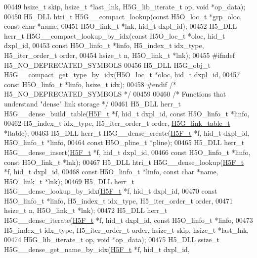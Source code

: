 \begin{DoxyCode}
00449     hsize\_t skip, hsize\_t *last\_lnk, H5G\_lib\_iterate\_t op, \textcolor{keywordtype}{void} *op\_data);
00450 H5\_DLL htri\_t H5G\_\_compact\_lookup(\textcolor{keyword}{const} H5O\_loc\_t *grp\_oloc, \textcolor{keyword}{const} \textcolor{keywordtype}{char} *name,
00451     H5O\_link\_t *lnk, hid\_t dxpl\_id);
00452 H5\_DLL herr\_t H5G\_\_compact\_lookup\_by\_idx(\textcolor{keyword}{const} H5O\_loc\_t *oloc, hid\_t dxpl\_id,
00453     \textcolor{keyword}{const} H5O\_linfo\_t *linfo, H5\_index\_t idx\_type, H5\_iter\_order\_t order,
00454     hsize\_t n, H5O\_link\_t *lnk);
00455 \textcolor{preprocessor}{#ifndef H5\_NO\_DEPRECATED\_SYMBOLS}
00456 H5\_DLL H5G\_obj\_t H5G\_\_compact\_get\_type\_by\_idx(H5O\_loc\_t *oloc, hid\_t dxpl\_id,
00457     \textcolor{keyword}{const} H5O\_linfo\_t *linfo, hsize\_t idx);
00458 \textcolor{preprocessor}{#endif }\textcolor{comment}{/* H5\_NO\_DEPRECATED\_SYMBOLS */}\textcolor{preprocessor}{}
00459 
00460 \textcolor{comment}{/* Functions that understand "dense" link storage */}
00461 H5\_DLL herr\_t H5G\_\_dense\_build\_table(\hyperlink{struct_h5_f__t}{H5F\_t} *f, hid\_t dxpl\_id, \textcolor{keyword}{const} H5O\_linfo\_t *linfo,
00462     H5\_index\_t idx\_type, H5\_iter\_order\_t order, \hyperlink{struct_h5_g__link__table__t}{H5G\_link\_table\_t} *ltable);
00463 H5\_DLL herr\_t H5G\_\_dense\_create(\hyperlink{struct_h5_f__t}{H5F\_t} *f, hid\_t dxpl\_id, H5O\_linfo\_t *linfo,
00464     \textcolor{keyword}{const} H5O\_pline\_t *pline);
00465 H5\_DLL herr\_t H5G\_\_dense\_insert(\hyperlink{struct_h5_f__t}{H5F\_t} *f, hid\_t dxpl\_id,
00466     \textcolor{keyword}{const} H5O\_linfo\_t *linfo, \textcolor{keyword}{const} H5O\_link\_t *lnk);
00467 H5\_DLL htri\_t H5G\_\_dense\_lookup(\hyperlink{struct_h5_f__t}{H5F\_t} *f, hid\_t dxpl\_id,
00468     \textcolor{keyword}{const} H5O\_linfo\_t *linfo, \textcolor{keyword}{const} \textcolor{keywordtype}{char} *name, H5O\_link\_t *lnk);
00469 H5\_DLL herr\_t H5G\_\_dense\_lookup\_by\_idx(\hyperlink{struct_h5_f__t}{H5F\_t} *f, hid\_t dxpl\_id,
00470     \textcolor{keyword}{const} H5O\_linfo\_t *linfo, H5\_index\_t idx\_type, H5\_iter\_order\_t order,
00471     hsize\_t n, H5O\_link\_t *lnk);
00472 H5\_DLL herr\_t H5G\_\_dense\_iterate(\hyperlink{struct_h5_f__t}{H5F\_t} *f, hid\_t dxpl\_id, \textcolor{keyword}{const} H5O\_linfo\_t *linfo,
00473     H5\_index\_t idx\_type, H5\_iter\_order\_t order, hsize\_t skip, hsize\_t *last\_lnk,
00474     H5G\_lib\_iterate\_t op, \textcolor{keywordtype}{void} *op\_data);
00475 H5\_DLL ssize\_t H5G\_\_dense\_get\_name\_by\_idx(\hyperlink{struct_h5_f__t}{H5F\_t}  *f, hid\_t dxpl\_id,

\end{DoxyCode}
